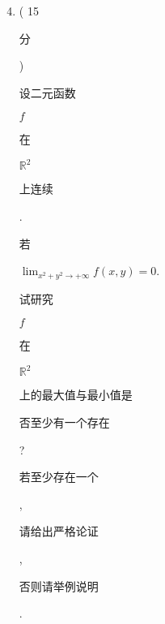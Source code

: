 \documentclass[10pt]{article}
\begin{document}
\begin{enumerate}
  \setcounter{enumi}{3}
  \item ( 15 \begin{CJK}{UTF8}{mj}分\end{CJK}) \begin{CJK}{UTF8}{mj}设二元函数\end{CJK} $f$ \begin{CJK}{UTF8}{mj}在\end{CJK} $\mathbb{R}^{2}$ \begin{CJK}{UTF8}{mj}上连续\end{CJK}. \begin{CJK}{UTF8}{mj}若\end{CJK} $\lim _{x^{2}+y^{2} \rightarrow+\infty} f(x, y)=0$. \begin{CJK}{UTF8}{mj}试研究\end{CJK} $f$ \begin{CJK}{UTF8}{mj}在\end{CJK} $\mathbb{R}^{2}$ \begin{CJK}{UTF8}{mj}上的最大值与最小值是\end{CJK} \begin{CJK}{UTF8}{mj}否至少有一个存在\end{CJK}? \begin{CJK}{UTF8}{mj}若至少存在一个\end{CJK}, \begin{CJK}{UTF8}{mj}请给出严格论证\end{CJK}, \begin{CJK}{UTF8}{mj}否则请举例说明\end{CJK}.


\end{enumerate}
\end{document}
